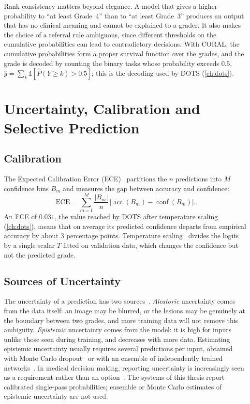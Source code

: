 

Rank consistency matters beyond elegance. A model that gives a higher probability to
``at least Grade~4'' than to ``at least Grade~3'' produces an output that has no clinical
meaning and cannot be explained to a grader. It also makes the choice of a referral rule
ambiguous, since different thresholds on the cumulative probabilities can lead to
contradictory decisions. With CORAL, the cumulative probabilities form a proper survival
function over the grades, and the grade is decoded by counting the binary tasks whose
probability exceeds $0.5$, $\hat y=\sum_k\mathbb{1}[\hat P(Y\geq k)>0.5]$; this is the
decoding used by DOTS (\cref{ch:dots}).

\section{Uncertainty, Calibration and Selective Prediction}
\label{sec:calib}

\subsection{Calibration}

The Expected Calibration Error (ECE)~\cite{naeini2015ece,guo2017calibration} partitions the $n$
predictions into $M$ confidence bins $B_m$ and measures the gap between accuracy and
confidence:
\begin{equation}
\mathrm{ECE} = \sum_{m=1}^{M} \frac{|B_m|}{n}\,\bigl|\operatorname{acc}(B_m) - \operatorname{conf}(B_m)\bigr| .
\label{eq:ece}
\end{equation}
An ECE of $0.031$, the value reached by DOTS after temperature scaling (\cref{ch:dots}),
means that on average its predicted confidence departs from empirical accuracy by about
$3$ percentage points. Temperature scaling~\cite{guo2017calibration} divides the logits
by a single scalar $T$ fitted on validation data, which changes the confidence but not the
predicted grade.

\subsection{Sources of Uncertainty}

The uncertainty of a prediction has two sources~\cite{kendall2017uncertainties}.
\emph{Aleatoric} uncertainty comes from the data itself: an image may be blurred, or the
lesions may be genuinely at the boundary between two grades, and more training data will
not remove this ambiguity. \emph{Epistemic} uncertainty comes from the model: it is high
for inputs unlike those seen during training, and decreases with more data. Estimating
epistemic uncertainty usually requires several predictions per input, obtained with Monte
Carlo dropout~\cite{gal2016dropout} or with an ensemble of independently trained
networks~\cite{lakshminarayanan2017ensembles}. In medical decision making, reporting
uncertainty is increasingly seen as a requirement rather than an
option~\cite{begoli2019uncertainty}. The systems of this thesis report calibrated
single-pass probabilities; ensemble or Monte Carlo estimates of epistemic uncertainty are
not used.

